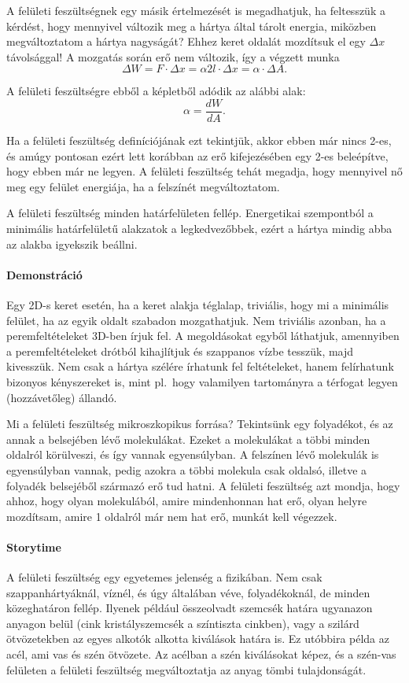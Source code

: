 \documentclass[12pt,a4paper]{scrartcl}
\begin{document}
A felületi feszültségnek egy másik értelmezését is megadhatjuk, ha feltesszük a kérdést, hogy mennyivel változik meg a hártya által tárolt energia, miközben megváltoztatom a hártya nagyságát? Ehhez keret oldalát mozdítsuk el egy $\Delta x$ távolsággal! A mozgatás során erő nem változik, így a végzett munka
\[\Delta W = F \cdot \Delta x = \alpha 2l \cdot \Delta x = \alpha  \cdot \Delta A.\]

A felületi feszültségre ebből a képletből adódik az alábbi alak:
\[\alpha  = \frac{{dW}}{{dA}}.\]

Ha a felületi feszültség definíciójának ezt tekintjük, akkor ebben már nincs 2-es, és amúgy pontosan ezért lett korábban az erő kifejezésében egy 2-es beleépítve, hogy ebben már ne legyen. A felületi feszültség tehát megadja, hogy mennyivel nő meg egy felület energiája, ha a felszínét megváltoztatom.

A felületi feszültség minden határfelületen fellép. Energetikai szempontból a minimális határfelületű alakzatok a legkedvezőbbek, ezért a hártya mindig abba az alakba igyekszik beállni. 

\footnotesize
\paragraph{Demonstráció} Egy 2D-s keret esetén, ha a keret alakja téglalap, triviális, hogy mi a minimális felület, ha az egyik oldalt szabadon mozgathatjuk. Nem triviális azonban, ha a peremfeltételeket 3D-ben írjuk fel. A megoldásokat egyből láthatjuk, amennyiben a peremfeltételeket drótból kihajlítjuk és szappanos vízbe tesszük, majd kivesszük. Nem csak a hártya szélére írhatunk fel feltételeket, hanem felírhatunk bizonyos kényszereket is, mint pl.\ hogy valamilyen tartományra a térfogat legyen (hozzávetőleg) állandó.
\normalsize

Mi a felületi feszültség mikroszkopikus forrása? Tekintsünk egy folyadékot, és az annak a belsejében lévő molekulákat. Ezeket a molekulákat a többi minden oldalról körülveszi, és így vannak egyensúlyban. A felszínen lévő molekulák is egyensúlyban vannak, pedig azokra a többi molekula csak oldalsó, illetve a folyadék belsejéből származó erő tud hatni. A felületi feszültség azt mondja, hogy ahhoz, hogy olyan molekulából, amire mindenhonnan hat erő, olyan helyre mozdítsam, amire 1 oldalról már nem hat erő, munkát kell végezzek.

\footnotesize
\paragraph{Storytime} A felületi feszültség egy egyetemes jelenség a fizikában. Nem csak szappanhártyáknál, víznél, és úgy általában véve, folyadékoknál, de minden közeghatáron fellép. Ilyenek például összeolvadt szemcsék határa ugyanazon anyagon belül (cink kristályszemcsék a színtiszta cinkben), vagy a szilárd ötvözetekben az egyes alkotók alkotta kiválások határa is. Ez utóbbira példa az acél, ami vas és szén ötvözete. Az acélban a szén kiválásokat képez, és a szén-vas felületen a felületi feszültség megváltoztatja az anyag tömbi tulajdonságát.
\end{document}
